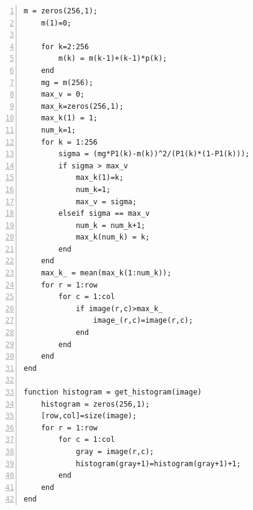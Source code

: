 \documentclass[11pt,oneside]{book}
\begin{document}
\begin{appendices}
\begin{lstlisting}[numbers=left, numberstyle=\tiny,keywordstyle=\color{blue!70},commentstyle=\color{red!50!green!50!blue!50},frame=shadowbox, rulesepcolor=\color{red!20!green!20!blue!20}]
    m = zeros(256,1);
    m(1)=0;
   
    for k=2:256
        m(k) = m(k-1)+(k-1)*p(k);
    end
    mg = m(256);
    max_v = 0;
    max_k=zeros(256,1);
    max_k(1) = 1;
    num_k=1;
    for k = 1:256
        sigma = (mg*P1(k)-m(k))^2/(P1(k)*(1-P1(k)));
        if sigma > max_v
            max_k(1)=k;
            num_k=1;
            max_v = sigma;
        elseif sigma == max_v
            num_k = num_k+1;
            max_k(num_k) = k;
        end
    end
    max_k_ = mean(max_k(1:num_k));
    for r = 1:row
        for c = 1:col
            if image(r,c)>max_k_
                image_(r,c)=image(r,c);
            end
        end
    end
end

function histogram = get_histogram(image)
    histogram = zeros(256,1);
    [row,col]=size(image);
    for r = 1:row
        for c = 1:col
            gray = image(r,c);
            histogram(gray+1)=histogram(gray+1)+1;
        end
    end
end

\end{lstlisting}



\end{appendices}
\end{document}
